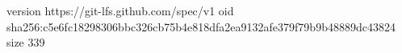 version https://git-lfs.github.com/spec/v1
oid sha256:c5e6fc18298306bbc326cb75b4e818dfa2ea9132afe379f79b9b48889dc43824
size 339
